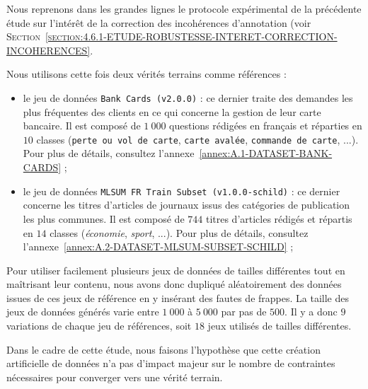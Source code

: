 			Nous reprenons dans les grandes lignes le protocole expérimental de la précédente étude sur l'intérêt de la correction des incohérences d'annotation (voir \textsc{Section~\ref{section:4.6.1-ETUDE-ROBUSTESSE-INTERET-CORRECTION-INCOHERENCES}}.
			
			Nous utilisons cette fois deux vérités terrains comme références :
			\begin{itemize}
				\item le jeu de données \texttt{Bank Cards (v2.0.0)} : ce dernier traite des demandes les plus fréquentes des clients en ce qui concerne la gestion de leur carte bancaire. Il est composé de $1~000$ questions rédigées en français et réparties en $10$ classes (\texttt{perte ou vol de carte}, \texttt{carte avalée}, \texttt{commande de carte}, ...). Pour plus de détails, consultez l'annexe~\ref{annex:A.1-DATASET-BANK-CARDS} ;
				\item le jeu de données \texttt{MLSUM FR Train Subset (v1.0.0-schild)} : ce dernier concerne les titres d'articles de journaux issus des catégories de publication les plus communes. Il est composé de $744$  titres d'articles rédigés et répartis en $14$ classes (\textit{économie}, \textit{sport}, ...). Pour plus de détails, consultez l'annexe~\ref{annex:A.2-DATASET-MLSUM-SUBSET-SCHILD} ;
			\end{itemize}
			
			Pour utiliser facilement plusieurs jeux de données de tailles différentes tout en maîtrisant leur contenu, nous avons donc dupliqué aléatoirement des données issues de ces jeux de référence en y insérant des fautes de frappes.
			La taille des jeux de données générés varie entre $1~000$ à $5~000$ par pas de $500$.
			Il y a donc $9$ variations de chaque jeu de références, soit $18$ jeux utilisés de tailles différentes.
			
			\begin{leftBarWarning}
				Dans le cadre de cette étude, nous faisons l'hypothèse que cette création artificielle de données n'a pas d'impact majeur sur le nombre de contraintes nécessaires pour converger vers une vérité terrain.
			\end{leftBarWarning}
			
